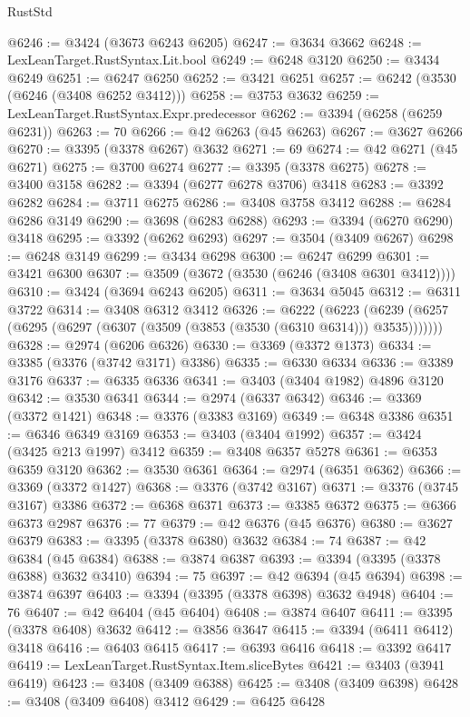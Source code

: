\begin{lexlean}{RustStd}
\begin{coremodule}
@6246 := @3424 (@3673 @6243 @6205)
@6247 := @3634 @3662
@6248 := LexLeanTarget.RustSyntax.Lit.bool
@6249 := @6248 @3120
@6250 := @3434 @6249
@6251 := @6247 @6250
@6252 := @3421 @6251
@6257 := @6242 (@3530 (@6246 (@3408 @6252 @3412)))
@6258 := @3753 @3632
@6259 := LexLeanTarget.RustSyntax.Expr.predecessor
@6262 := @3394 (@6258 (@6259 @6231))
@6263 := 70
@6266 := @42 @6263 (@45 @6263)
@6267 := @3627 @6266
@6270 := @3395 (@3378 @6267) @3632
@6271 := 69
@6274 := @42 @6271 (@45 @6271)
@6275 := @3700 @6274
@6277 := @3395 (@3378 @6275)
@6278 := @3400 @3158
@6282 := @3394 (@6277 @6278 @3706) @3418
@6283 := @3392 @6282
@6284 := @3711 @6275
@6286 := @3408 @3758 @3412
@6288 := @6284 @6286 @3149
@6290 := @3698 (@6283 @6288)
@6293 := @3394 (@6270 @6290) @3418
@6295 := @3392 (@6262 @6293)
@6297 := @3504 (@3409 @6267)
@6298 := @6248 @3149
@6299 := @3434 @6298
@6300 := @6247 @6299
@6301 := @3421 @6300
@6307 := @3509 (@3672 (@3530 (@6246 (@3408 @6301 @3412))))
@6310 := @3424 (@3694 @6243 @6205)
@6311 := @3634 @5045
@6312 := @6311 @3722
@6314 := @3408 @6312 @3412
@6326 := @6222
    (@6223 (@6239 (@6257 (@6295 (@6297 (@6307 (@3509 (@3853 (@3530 (@6310 @6314))) @3535)))))))
@6328 := @2974 (@6206 @6326)
@6330 := @3369 (@3372 @1373)
@6334 := @3385 (@3376 (@3742 @3171) @3386)
@6335 := @6330 @6334
@6336 := @3389 @3176
@6337 := @6335 @6336
@6341 := @3403 (@3404 @1982) @4896 @3120
@6342 := @3530 @6341
@6344 := @2974 (@6337 @6342)
@6346 := @3369 (@3372 @1421)
@6348 := @3376 (@3383 @3169)
@6349 := @6348 @3386
@6351 := @6346 @6349 @3169
@6353 := @3403 (@3404 @1992)
@6357 := @3424 (@3425 @213 @1997) @3412
@6359 := @3408 @6357 @5278
@6361 := @6353 @6359 @3120
@6362 := @3530 @6361
@6364 := @2974 (@6351 @6362)
@6366 := @3369 (@3372 @1427)
@6368 := @3376 (@3742 @3167)
@6371 := @3376 (@3745 @3167) @3386
@6372 := @6368 @6371
@6373 := @3385 @6372
@6375 := @6366 @6373 @2987
@6376 := 77
@6379 := @42 @6376 (@45 @6376)
@6380 := @3627 @6379
@6383 := @3395 (@3378 @6380) @3632
@6384 := 74
@6387 := @42 @6384 (@45 @6384)
@6388 := @3874 @6387
@6393 := @3394 (@3395 (@3378 @6388) @3632 @3410)
@6394 := 75
@6397 := @42 @6394 (@45 @6394)
@6398 := @3874 @6397
@6403 := @3394 (@3395 (@3378 @6398) @3632 @4948)
@6404 := 76
@6407 := @42 @6404 (@45 @6404)
@6408 := @3874 @6407
@6411 := @3395 (@3378 @6408) @3632
@6412 := @3856 @3647
@6415 := @3394 (@6411 @6412) @3418
@6416 := @6403 @6415
@6417 := @6393 @6416
@6418 := @3392 @6417
@6419 := LexLeanTarget.RustSyntax.Item.sliceBytes
@6421 := @3403 (@3941 @6419)
@6423 := @3408 (@3409 @6388)
@6425 := @3408 (@3409 @6398)
@6428 := @3408 (@3409 @6408) @3412
@6429 := @6425 @6428

\end{coremodule}
\end{lexlean}
